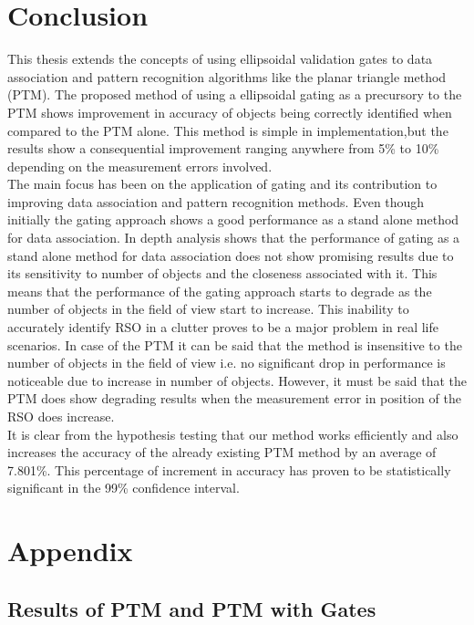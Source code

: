 \documentclass[]{aiaa-tc}%
\begin{document}
\section{Conclusion}

This thesis extends the concepts of using ellipsoidal validation gates to data association and pattern recognition algorithms like the planar triangle method (PTM). The proposed method of using a ellipsoidal gating as a precursory to the PTM shows improvement in accuracy of objects being correctly identified when compared to the PTM alone. This method is simple in implementation,but the results show a consequential improvement ranging anywhere from 5\% to 10\% depending on the measurement errors involved.\\

The main focus has been on the application of gating and its contribution to improving data association and pattern recognition methods. Even though initially the gating approach shows a good performance as a stand alone method for data association. In depth analysis shows that the performance of gating as a stand alone method for data association does not show promising results due to its sensitivity to number of objects and the closeness associated with it. This means that  the performance of the gating approach starts to degrade as the number of objects in the field of view start to increase. This inability to accurately identify RSO in a clutter proves to be a major problem in real life scenarios. In case of the PTM it can be said that the method is insensitive to the number of objects in the field of view i.e. no significant drop in performance is noticeable due to increase in number of objects. However, it must be said that the PTM does show degrading results when the measurement error in position of the RSO does increase.\\

It is clear from the hypothesis testing that our method works efficiently and also increases the accuracy of the already existing PTM method by an average of 7.801\%. This percentage of increment in accuracy has proven to be statistically significant in the 99\% confidence interval.







\section*{Appendix}
\subsection{Results of PTM and PTM with Gates}
\end{document}
